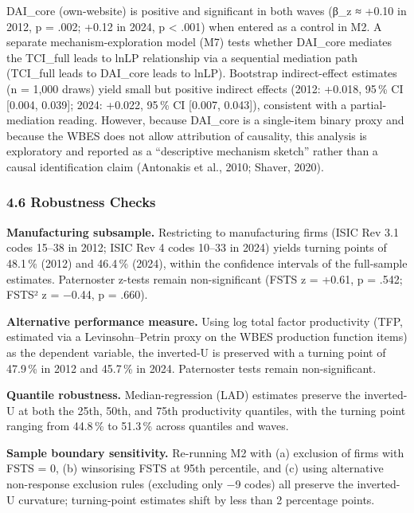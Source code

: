 \documentclass[12pt,a4paper]{article}
\begin{document}
DAI\_core (own-website) is positive and significant in both waves (β\_z
≈ +0.10 in 2012, p = .002; +0.12 in 2024, p \textless{} .001) when
entered as a control in M2. A separate mechanism-exploration model (M7)
tests whether DAI\_core mediates the TCI\_full leads to lnLP
relationship via a sequential mediation path (TCI\_full leads to
DAI\_core leads to lnLP). Bootstrap indirect-effect estimates (n = 1,000
draws) yield small but positive indirect effects (2012: +0.018, 95\,\%
CI {[}0.004, 0.039{]}; 2024: +0.022, 95\,\% CI {[}0.007, 0.043{]}),
consistent with a partial-mediation reading. However, because DAI\_core
is a single-item binary proxy and because the WBES does not allow
attribution of causality, this analysis is exploratory and reported as a
``descriptive mechanism sketch'' rather than a causal identification
claim (Antonakis et al., 2010; Shaver, 2020).

\hypertarget{46-robustness-checks}{%
\subsubsection{4.6 Robustness Checks}\label{46-robustness-checks}}

\textbf{Manufacturing subsample.} Restricting to manufacturing firms
(ISIC Rev 3.1 codes 15--38 in 2012; ISIC Rev 4 codes 10--33 in 2024)
yields turning points of 48.1\,\% (2012) and 46.4\,\% (2024), within the
confidence intervals of the full-sample estimates. Paternoster z-tests
remain non-significant (FSTS z = +0.61, p = .542; FSTS² z = −0.44, p =
.660).

\textbf{Alternative performance measure.} Using log total factor
productivity (TFP, estimated via a Levinsohn--Petrin proxy on the WBES
production function items) as the dependent variable, the inverted-U is
preserved with a turning point of 47.9\,\% in 2012 and 45.7\,\% in 2024.
Paternoster tests remain non-significant.

\textbf{Quantile robustness.} Median-regression (LAD) estimates preserve
the inverted-U at both the 25th, 50th, and 75th productivity quantiles,
with the turning point ranging from 44.8\,\% to 51.3\,\% across
quantiles and waves.

\textbf{Sample boundary sensitivity.} Re-running M2 with (a) exclusion
of firms with FSTS = 0, (b) winsorising FSTS at 95th percentile, and (c)
using alternative non-response exclusion rules (excluding only −9 codes)
all preserve the inverted-U curvature; turning-point estimates shift by
less than 2 percentage points.
\end{document}
